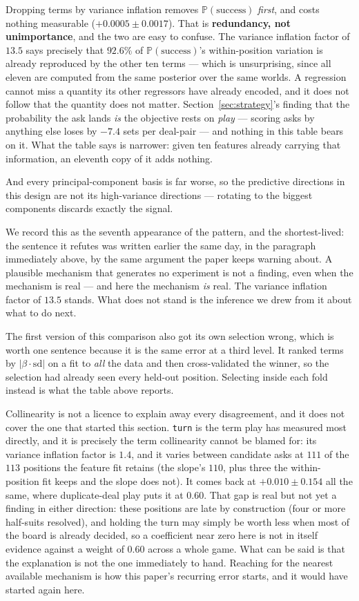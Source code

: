 \documentclass[11pt,a4paper]{article}
\newcommand{\Prob}{\ensuremath{\mathbb{P}}}
\begin{document}
Dropping terms by variance inflation removes $\Prob(\text{success})$
\emph{first}, and costs nothing measurable ($+0.0005 \pm 0.0017$). That is
\textbf{redundancy, not unimportance}, and the two are easy to confuse. The
variance inflation factor of $13.5$ says precisely that $92.6\%$ of
$\Prob(\text{success})$'s within-position variation is already reproduced by the
other ten terms --- which is unsurprising, since all eleven are computed from the
same posterior over the same worlds. A regression cannot miss a quantity its
other regressors have already encoded, and it does not follow that the quantity
does not matter. Section~\ref{sec:strategy}'s finding that the probability the ask
lands \emph{is} the objective rests on \emph{play} --- scoring asks by anything
else loses by $-7.4$ sets per deal-pair --- and nothing in this table bears on
it. What the table says is narrower: given ten features already carrying that
information, an eleventh copy of it adds nothing.

And every principal-component basis is far worse, so the predictive directions in
this design are not its high-variance directions --- rotating to the biggest
components discards exactly the signal.

We record this as the seventh appearance of the pattern, and the shortest-lived:
the sentence it refutes was written earlier the same day, in the paragraph
immediately above, by the same argument the paper keeps warning about. A
plausible mechanism that generates no experiment is not a finding, even when the
mechanism is real --- and here the mechanism \emph{is} real. The variance
inflation factor of $13.5$ stands. What does not stand is the inference we drew
from it about what to do next.

The first version of this comparison also got its own selection wrong, which is
worth one sentence because it is the same error at a third level. It ranked
terms by $|\beta \cdot \mathrm{sd}|$ on a fit to \emph{all} the data and then
cross-validated the winner, so the selection had already seen every held-out
position. Selecting inside each fold instead is what the table above reports.

Collinearity is not a licence to explain away every disagreement, and it does not
cover the one that started this section. \texttt{turn} is the term play has
measured most directly, and it is precisely the term collinearity cannot be
blamed for: its variance inflation factor is $1.4$, and it varies between
candidate asks at $111$ of the $113$ positions the feature fit retains (the
slope's $110$, plus three the within-position fit keeps and the slope does not). It comes back at
$+0.010 \pm 0.154$ all the same, where duplicate-deal play puts it at $0.60$.
That gap is real but not yet a finding in either direction: these positions are
late by construction (four or more half-suits resolved), and holding the turn may
simply be worth less when most of the board is already decided, so a coefficient
near zero here is not in itself evidence against a weight of $0.60$ across a whole
game. What can be said is that the explanation is not the one immediately to
hand. Reaching for the nearest available mechanism is how this paper's recurring
error starts, and it would have started again here.
\end{document}
